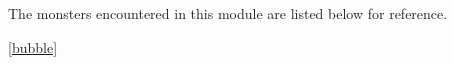 \documentclass[palace_of_the_silver_princess]{subfiles}
\begin{document}
\selectfont
\clearpage


The monsters encountered in this module are listed below for reference.

\ref{bubble} \pageref{bubble}
\end{document}
